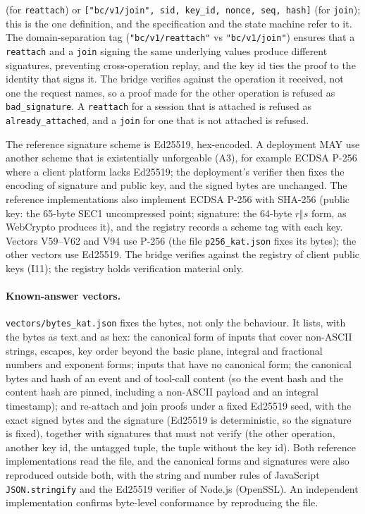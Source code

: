 \begin{itemize}[leftmargin=2em]
(for \texttt{reattach}) or
\texttt{["bc/v1/join", sid, key\_id, nonce, seq, hash]}
(for \texttt{join}); this is the one definition, and the specification
and the state machine refer to it. The domain-separation tag
(\texttt{"bc/v1/reattach"} vs \texttt{"bc/v1/join"})
ensures that a \texttt{reattach} and a \texttt{join} signing the
same underlying values produce different signatures, preventing
cross-operation replay, and the key id ties the proof to the identity
that signs it. The bridge verifies against the operation it received,
not one the request names, so a proof made for the other operation is
refused as \texttt{bad\_signature}. A \texttt{reattach} for a session
that is attached is refused as \texttt{already\_attached}, and a
\texttt{join} for one that is not attached is refused.
\end{itemize}
The reference signature scheme is Ed25519, hex-encoded. A deployment
MAY use another scheme that is existentially unforgeable (A3), for
example ECDSA P-256 where a client platform lacks Ed25519; the
deployment's verifier then fixes the encoding of signature and public
key, and the signed bytes are unchanged. The reference implementations
also implement ECDSA P-256 with SHA-256 (public key: the 65-byte SEC1
uncompressed point; signature: the 64-byte $r \Vert s$ form, as
WebCrypto produces it), and the registry records a scheme tag with each
key. Vectors V59--V62 and V94 use P-256 (the file \texttt{p256\_kat.json} fixes its bytes); the other vectors use Ed25519. The
bridge verifies against
the registry of client public keys (I11); the registry holds
verification material only.

\paragraph{Known-answer vectors.}\label{sec:wire-kat}
\texttt{vectors/bytes\_kat.json} fixes the bytes, not only the behaviour.
It lists, with the bytes as text and as hex: the canonical form of
inputs that cover non-ASCII strings, escapes, key order beyond the
basic plane, integral and fractional numbers and exponent forms; inputs
that have no canonical form; the canonical bytes and hash of an event
and of tool-call content (so the event hash and the content hash are
pinned, including a non-ASCII payload and an integral timestamp); and
re-attach and join proofs under a fixed Ed25519 seed, with the exact
signed bytes and the signature (Ed25519 is deterministic, so the
signature is fixed), together with signatures that must not verify (the
other operation, another key id, the untagged tuple, the tuple without
the key id). Both reference implementations read the file, and the
canonical forms and signatures were also reproduced outside both, with
the string and number rules of JavaScript \texttt{JSON.stringify} and the
Ed25519 verifier of Node.js (OpenSSL). An independent implementation confirms
byte-level conformance by reproducing the file.

